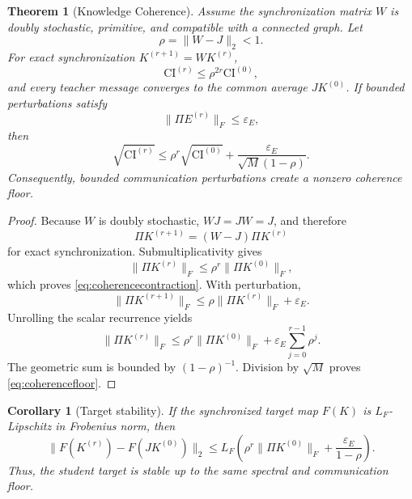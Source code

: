 \documentclass[10pt,twocolumn,a4paper]{article}
\newtheorem{theorem}{Theorem}
\newtheorem{corollary}{Corollary}
\begin{document}
\begin{theorem}[Knowledge Coherence]
\label{thm:coherence}
Assume the synchronization matrix \(W\) is doubly stochastic, primitive, and compatible with a connected graph. Let
\begin{equation}
 \rho=\|W-J\|_2<1.
\end{equation}
For exact synchronization \(K^{(r+1)}=WK^{(r)}\),
\begin{equation}
 \mathrm{CI}^{(r)}\le\rho^{2r}\mathrm{CI}^{(0)},
\label{eq:coherencecontraction}
\end{equation}
and every teacher message converges to the common average \(JK^{(0)}\). If bounded perturbations satisfy
\begin{equation}
 \|\Pi E^{(r)}\|_F\le\varepsilon_E,
\end{equation}
then
\begin{equation}
 \sqrt{\mathrm{CI}^{(r)}}
 \le\rho^r\sqrt{\mathrm{CI}^{(0)}}
 +\frac{\varepsilon_E}{\sqrt{M}(1-\rho)}.
\label{eq:coherencefloor}
\end{equation}
Consequently, bounded communication perturbations create a nonzero coherence floor.
\end{theorem}

\begin{proof}
Because \(W\) is doubly stochastic, \(WJ=JW=J\), and therefore
\begin{equation}
 \Pi K^{(r+1)}=(W-J)\Pi K^{(r)}
\end{equation}
for exact synchronization. Submultiplicativity gives
\begin{equation}
 \|\Pi K^{(r)}\|_F\le\rho^r\|\Pi K^{(0)}\|_F,
\end{equation}
which proves \cref{eq:coherencecontraction}. With perturbation,
\begin{equation}
 \|\Pi K^{(r+1)}\|_F
 \le\rho\|\Pi K^{(r)}\|_F+\varepsilon_E.
\end{equation}
Unrolling the scalar recurrence yields
\begin{equation}
 \|\Pi K^{(r)}\|_F
 \le\rho^r\|\Pi K^{(0)}\|_F
 +\varepsilon_E\sum_{j=0}^{r-1}\rho^j.
\end{equation}
The geometric sum is bounded by \((1-\rho)^{-1}\). Division by \(\sqrt{M}\) proves \cref{eq:coherencefloor}.
\end{proof}

\begin{corollary}[Target stability]
If the synchronized target map \(F(K)\) is \(L_F\)-Lipschitz in Frobenius norm, then
\begin{equation}
 \|F(K^{(r)})-F(JK^{(0)})\|_2
 \le L_F\left(\rho^r\|\Pi K^{(0)}\|_F+\frac{\varepsilon_E}{1-\rho}\right).
\label{eq:targetstability}
\end{equation}
Thus, the student target is stable up to the same spectral and communication floor.
\end{corollary}
\end{document}
